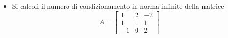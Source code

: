 \begin{itemize}
\item Si calcoli il numero di condizionamento in norma infinito della
matrice
\bigskip
\[
A=\left[
\begin{array}{ccc}
1 & 2 & -2 \\
1 & 1 & 1\\
-1 & 0 & 2
\end{array}\right]
\]
\end{itemize}
